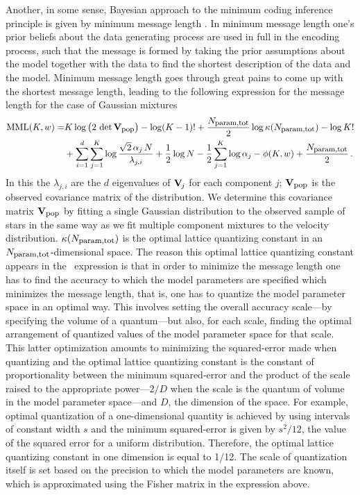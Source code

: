 Another, in some sense, Bayesian approach to the minimum coding inference
principle is given by minimum message length
\citep[\MML;][]{wallace68a,wallacebook}. In minimum message length
one's prior beliefs about the data generating process are used in full
in the encoding process, such that the message is formed by taking the
prior assumptions about the model together with the data to find the
shortest description of the data and the model. Minimum message length
goes through great pains to come up with the shortest message length,
leading to the following expression for the message length for the
case of Gaussian mixtures \citep{wallace87a,oliver94a,Oliver96a}
\begin{equation}\label{eq:mml}
\begin{split}
\mathrm{MML}(K,w) = & K \log\left(2\,\det \mathbf{V}_{\mbox{{\footnotesize pop}}}\right)
-\log(K-1)! +\frac{N_{\mbox{{\footnotesize param,tot}}}}{2}\log\kappa(N_{\mbox{{\footnotesize param,tot}}}) - \log K!\\
& + \sum_{i=1}^{d}\sum_{j=1}^K \log \frac{\sqrt{2}\,\alpha_j\,N}{\lambda_{j,i}}+
\frac{1}{2}\log N -
\frac{1}{2}\sum_{j=1}^K \log \alpha_j -
\phi(K,w) +\frac{N_{\mbox{{\footnotesize param,tot}}}}{2}\, .
\end{split}
\end{equation}
In this the $\lambda_{j,i}$ are the $d$ eigenvalues of $\mathbf{V}_{\!j}$ for each
component $j$; $\mathbf{V}_{\mbox{{\footnotesize pop}}}$ is the observed
covariance matrix of the distribution. We determine this covariance
matrix $\mathbf{V}_{\mbox{{\footnotesize pop}}}$ by fitting a single Gaussian
distribution to the observed sample of stars in the same way as we fit
multiple component mixtures to the velocity
distribution. $\kappa(N_{\mbox{{\footnotesize param,tot}}})$ is the optimal lattice quantizing
constant in an $N_{\mbox{{\footnotesize param,tot}}}$-dimensional space. The reason this
optimal lattice quantizing constant appears in the \MML\ expression is
that in order to minimize the message length one has to find the
accuracy to which the model parameters are specified which minimizes
the message length, that is, one has to quantize the model parameter
space in an optimal way. This involves setting the overall accuracy
scale---by specifying the volume of a quantum---but also, for each
scale, finding the optimal arrangement of quantized values of the
model parameter space for that scale. This latter optimization amounts
to minimizing the squared-error made when quantizing and the optimal
lattice quantizing constant is the constant of proportionality between
the minimum squared-error and the product of the scale raised to the
appropriate power---$2/D$ when the scale is the quantum of volume in
the model parameter space---and $D$, the dimension of the space. For
example, optimal quantization of a one-dimensional quantity is
achieved by using intervals of constant width $s$ and the minimum
squared-error is given by $s^2/12$, the value of the squared error for
a uniform distribution. Therefore, the optimal lattice quantizing
constant in one dimension is equal to 1/12. The scale of quantization
itself is set based on the precision to which the model parameters are
known, which is approximated using the Fisher matrix in the expression
above.


